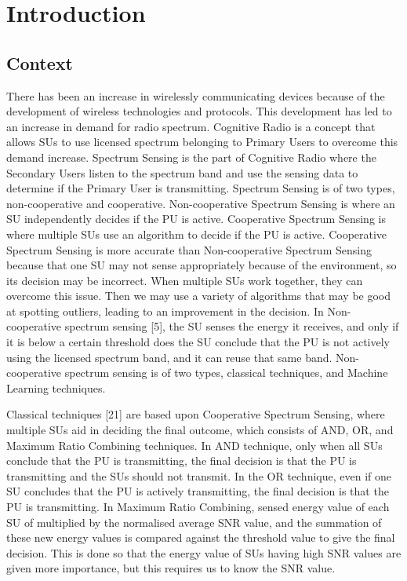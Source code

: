 \chapter {Introduction}
\label{introchap}



\section{Context}
There has been an increase in wirelessly communicating devices because of the development of wireless technologies and protocols. This development has led to an increase in demand for radio spectrum. Cognitive Radio is a concept that allows SUs to use licensed spectrum belonging to Primary Users to overcome this demand increase. Spectrum Sensing is the part of Cognitive Radio where the Secondary Users listen to the spectrum band and use the sensing data to determine if the Primary User is transmitting. Spectrum Sensing is of two types, non-cooperative and cooperative. Non-cooperative Spectrum Sensing is where an SU independently decides if the PU is active. Cooperative Spectrum Sensing is where multiple SUs use an algorithm to decide if the PU is active. Cooperative Spectrum Sensing is more accurate than Non-cooperative Spectrum Sensing because that one SU may not sense appropriately because of the environment, so its decision may be incorrect. When multiple SUs work together, they can overcome this issue. Then we may use a variety of algorithms that may be good at spotting outliers, leading to an improvement in the decision. 
In Non-cooperative spectrum sensing [5], the SU senses the energy it receives, and only if it is below a certain threshold does the SU conclude that the PU is not actively using the licensed spectrum band, and it can reuse that same band. Non-cooperative spectrum sensing is of two types, classical techniques, and Machine Learning techniques.

Classical techniques [21] are based upon Cooperative Spectrum Sensing, where multiple SUs aid in deciding the final outcome, which consists of AND, OR, and Maximum Ratio Combining techniques. In AND technique, only when all SUs conclude that the PU is transmitting, the final decision is that the PU is transmitting and the SUs should not transmit. In the OR technique, even if one SU concludes that the PU is actively transmitting, the final decision is that the PU is transmitting. In Maximum Ratio Combining, sensed energy value of each SU of multiplied by the normalised average SNR value, and the summation of these new energy values is compared against the threshold value to give the final decision. This is done so that the energy value of SUs having high SNR values are given more importance, but this requires us to know the SNR value. 

